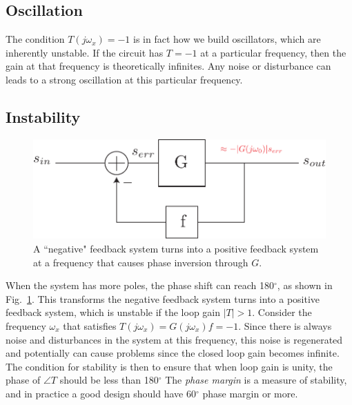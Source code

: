 \subsection{Oscillation}
The condition $T(j\omega_x) = -1$ is in fact how we build oscillators, which are inherently unstable. If the circuit has $T = -1$ at a particular frequency, then the gain at that frequency is theoretically infinites.  Any noise or disturbance can leads to a strong oscillation at this particular frequency.
\subsection{Instability}
\begin{figure}[tb]
\centering
\includegraphics[scale=.7]{fbblock_phase}
\caption{A ``negative" feedback system turns into a positive feedback system at a frequency that causes phase inversion through $G$.}
\label{fig:fbblock_phase}
\end{figure}
When the system has more poles, the phase shift can reach 180$^\circ$, as shown in Fig.~\ref{fig:fbblock_phase}. 
This transforms the negative feedback system turns into a positive feedback system, which is unstable if the loop gain $|T|>1$.  
Consider the frequency $\omega_x$ that satisfies $ T(j\omega_x) = G(j{\omega _x})f =  - 1$. Since there is always noise and disturbances in the system at this frequency, this noise is regenerated and potentially can cause problems since the closed loop gain becomes infinite. The condition for stability is then to ensure that when loop gain is unity, the phase of $\angle T$ should be less than 180$^\circ$  The \textit{phase margin} is a measure of stability, and in practice a good design should have 60$^\circ$ phase margin or more.
